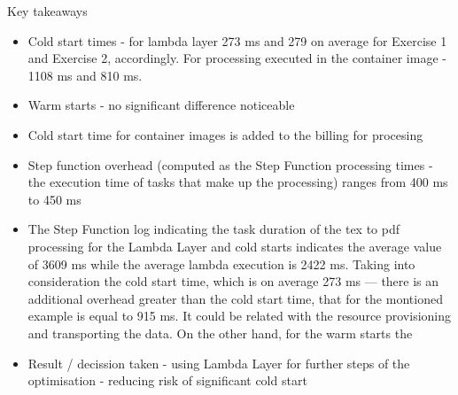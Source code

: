 
Key takeaways

\begin{itemize}
    \item Cold start times - for lambda layer 273 ms and 279 on average for Exercise 1 and Exercise 2, accordingly. For processing executed in the container image - 1108 ms and 810 ms.
    \item Warm starts - no significant difference noticeable
    \item Cold start time for container images is added to the billing for procesing
    \item Step function overhead (computed as the Step Function processing times - the execution time of tasks that make up the processing) ranges from 400 ms to 450 ms
    \item The Step Function log indicating the task duration of the tex to pdf processing for the Lambda Layer and cold starts indicates the average value of 3609 ms while the average lambda execution is 2422 ms. Taking into consideration the cold start time, which is on average 273 ms --- there is an additional overhead greater than the cold start time, that for the montioned example is equal to 915 ms. It could be related with the resource provisioning and transporting the data. On the other hand, for the warm starts the 
    \item Result / decission taken - using Lambda Layer for further steps of the optimisation - reducing risk of significant cold start
\end{itemize}

